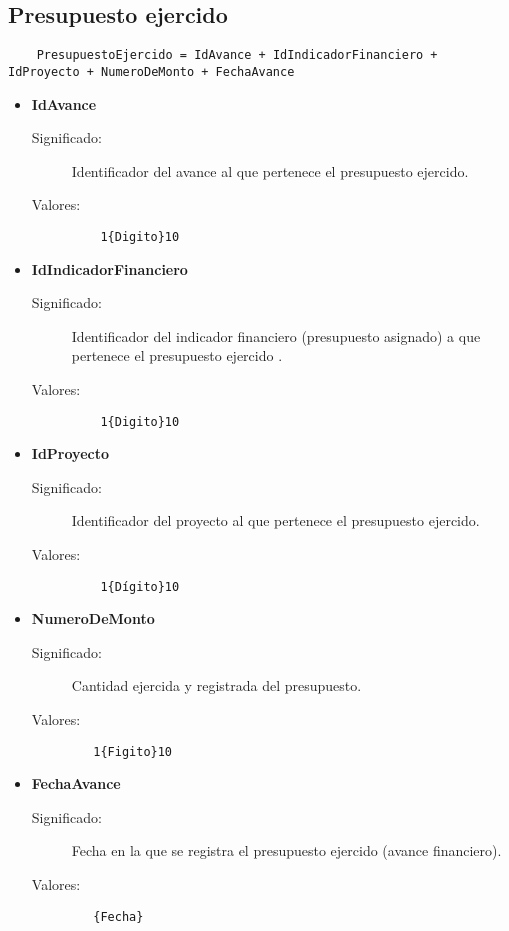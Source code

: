 \subsection{Presupuesto ejercido}
\label{dd:PresupuestoEjercido}
\begin{lstlisting}
    PresupuestoEjercido = IdAvance + IdIndicadorFinanciero + IdProyecto + NumeroDeMonto + FechaAvance
\end{lstlisting}
 \begin{itemize}

    \item \textbf{IdAvance}
      \begin{description}
        \item [Significado:] Identificador del avance al que pertenece el presupuesto ejercido.
        \item [Valores:]{\begin{lstlisting}
	1{Digito}10\end{lstlisting}}\end{description}

    \item \textbf{IdIndicadorFinanciero}
      \begin{description}
        \item [Significado:] Identificador del indicador financiero (presupuesto asignado) a que pertenece el presupuesto ejercido .
        \item [Valores:]{\begin{lstlisting}
	1{Digito}10
\end{lstlisting}}\end{description}
 
\item \textbf{IdProyecto}
      \begin{description}
        \item [Significado:] Identificador del proyecto al que pertenece el presupuesto ejercido.
        \item [Valores:]{\begin{lstlisting}
	1{Dígito}10
\end{lstlisting}}\end{description}

    \item \textbf{NumeroDeMonto}
      \begin{description}
        \item [Significado:] Cantidad ejercida y registrada del presupuesto.
        \item [Valores:]{\begin{lstlisting}
   1{Figito}10
\end{lstlisting}}\end{description}

\item \textbf{FechaAvance}
      \begin{description}
        \item [Significado:] Fecha en la que se registra el presupuesto ejercido (avance financiero).
        \item [Valores:]{\begin{lstlisting}
   {Fecha}
\end{lstlisting}}\end{description}

\end{itemize}